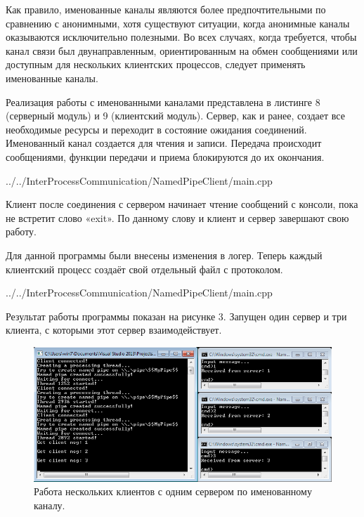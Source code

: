 \documentclass[a4paper, 12pt]{report}		%
\begin{document}
Как правило, именованные каналы являются более предпочтительными по сравнению с анонимными, хотя существуют ситуации, когда анонимные каналы оказываются исключительно полезными. Во всех случаях, когда требуется, чтобы канал связи был двунаправленным, ориентированным на обмен сообщениями или доступным для нескольких клиентских процессов, следует применять именованные каналы.

Реализация работы с именованными каналами представлена в листинге 8 (серверный модуль) и 9 (клиентский модуль). Сервер, как и ранее, создает все необходимые ресурсы и переходит в состояние ожидания соединений. Именованный канал создается для чтения и записи. Передача происходит сообщениями, функции передачи и приема блокируются до их окончания.


{../../InterProcessCommunication/NamedPipeClient/main.cpp}
\vspace{3em}

Клиент после соединения с сервером начинает чтение сообщений с консоли, пока не
встретит слово «exit». По данному слову и клиент и сервер завершают свою работу.

Для данной программы были внесены изменения в логер. Теперь каждый клиентский процесс создаёт свой отдельный файл с протоколом.


{../../InterProcessCommunication/NamedPipeClient/main.cpp}
\vspace{3em}

Результат работы программы показан на рисунке 3. Запущен один сервер и три клиента, с которыми этот сервер взаимодействует.
\vspace{2em}

\begin{figure}[h!]
\centering
\includegraphics[scale=0.75]{res/03_named_pipes}
\caption{Работа нескольких клиентов с одним сервером по именованному каналу.}
\end{figure}
\end{document}
